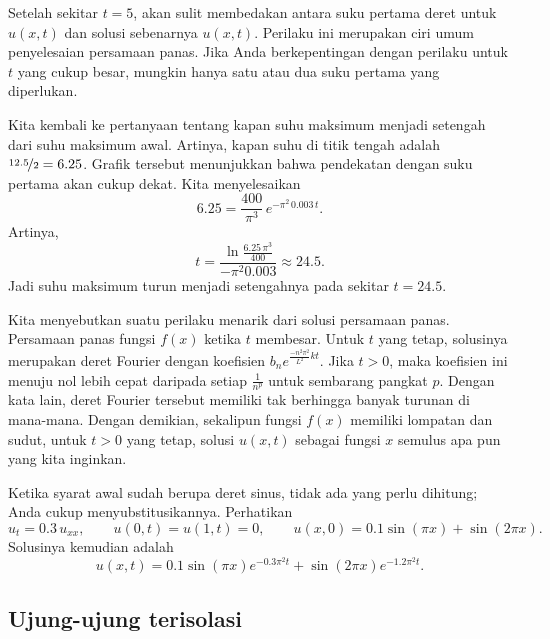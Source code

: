 \begin{example}
Setelah sekitar $t=5$,
akan sulit membedakan
antara suku pertama deret untuk $u(x,t)$ dan 
solusi sebenarnya $u(x,t)$.  Perilaku ini
merupakan ciri umum penyelesaian persamaan panas.
Jika Anda berkepentingan dengan perilaku untuk $t$ yang cukup besar, mungkin hanya
satu atau dua suku pertama yang diperlukan.

Kita kembali ke pertanyaan tentang kapan suhu maksimum menjadi setengah dari
suhu maksimum awal.  Artinya, kapan suhu
di titik tengah adalah $\nicefrac{12.5}{2} = 6.25$.  Grafik tersebut menunjukkan
bahwa pendekatan dengan suku pertama akan cukup dekat.  Kita
menyelesaikan
\begin{equation*}
6.25 =
\frac{400}{\pi^3}
\, e^{-\pi^2 \, 0.003 \, t} .
\end{equation*}
Artinya,
\begin{equation*}
t =
\frac{\ln \frac{6.25\,\pi^3}{400}}{-\pi^2 0.003}
\approx 24.5 .
\end{equation*}
Jadi suhu maksimum turun menjadi setengahnya pada sekitar $t=24.5$.
\end{example}

Kita menyebutkan suatu perilaku menarik dari solusi persamaan panas.
Persamaan panas
 fungsi $f(x)$ ketika $t$ membesar.  Untuk $t$ yang tetap,
solusinya merupakan deret Fourier dengan koefisien
$b_n e^{\frac{-n^2 \pi^2}{L^2} k t}$.  Jika $t > 0$, maka koefisien ini
menuju nol lebih cepat daripada setiap $\frac{1}{n^p}$ untuk sembarang pangkat $p$.  Dengan kata
lain, deret Fourier tersebut memiliki tak berhingga banyak turunan di mana-mana.
Dengan demikian, sekalipun fungsi $f(x)$ memiliki lompatan dan sudut, untuk
$t > 0$ yang tetap, solusi
$u(x,t)$ sebagai fungsi $x$ semulus apa pun yang kita
inginkan.

\begin{example}
Ketika syarat awal sudah berupa deret sinus, tidak ada yang perlu
dihitung; Anda cukup menyubstitusikannya.  Perhatikan
\begin{equation*}
u_t = 0.3 \, u_{xx}, \qquad u(0,t)=u(1,t)=0, \qquad u(x,0) = 0.1 \sin(\pi x) +
\sin(2\pi x) .
\end{equation*}
Solusinya kemudian adalah
\begin{equation*}
u(x,t) =
0.1 \sin(\pi x) e^{- 0.3 \pi^2 t}
+ 
\sin(2 \pi x) e^{- 1.2 \pi^2 t} .
\end{equation*}
\end{example}

\subsection{Ujung-ujung terisolasi}

